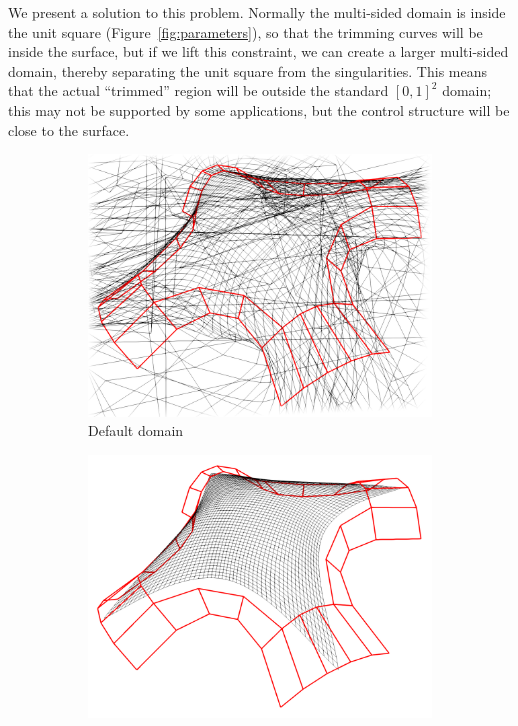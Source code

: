 \documentclass[9pt,academicons]{article}
\begin{document}
We present a solution to this problem. Normally the multi-sided domain is inside the unit
square (Figure~\ref{fig:parameters}), so that the trimming curves will be inside the
surface, but if we lift this constraint, we can create a larger multi-sided domain,
thereby separating the unit square from the singularities. This means that the actual ``trimmed''
region will be outside the standard $[0,1]^2$ domain; this may not be supported by some
applications, but the control structure will be close to the surface.
\begin{figure}[h!]
  \begin{subfigure}{.3\textwidth}
    \centering
    \includegraphics[width=\textwidth]{images/8sided-1.png}
    \caption{Default domain}
    \label{fig:8sided-default}
  \end{subfigure}
  \hfill
  \begin{subfigure}{.3\textwidth}
    \centering
    \includegraphics[width=\textwidth]{images/8sided-2.png}

\end{subfigure}
\end{figure}
\end{document}
